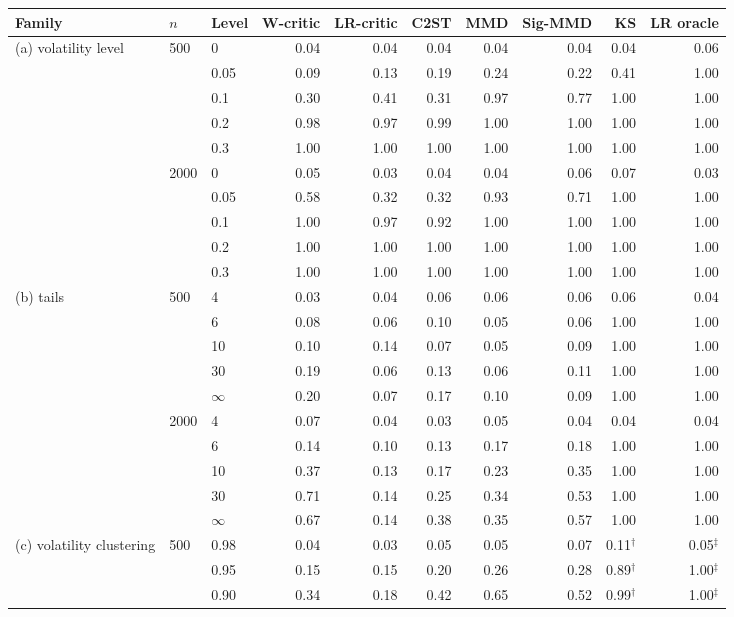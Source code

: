 \begin{tabular}{lllrrrrrrr}
\toprule
Family & $n$ & Level & W-critic & LR-critic & C2ST & MMD & Sig-MMD & KS & LR oracle \\
\midrule
(a) volatility level & 500 & 0 & 0.04 & 0.04 & 0.04 & 0.04 & 0.04 & 0.04 & 0.06 \\
 &  & 0.05 & 0.09 & 0.13 & 0.19 & 0.24 & 0.22 & 0.41 & 1.00 \\
 &  & 0.1 & 0.30 & 0.41 & 0.31 & 0.97 & 0.77 & 1.00 & 1.00 \\
 &  & 0.2 & 0.98 & 0.97 & 0.99 & 1.00 & 1.00 & 1.00 & 1.00 \\
 &  & 0.3 & 1.00 & 1.00 & 1.00 & 1.00 & 1.00 & 1.00 & 1.00 \\
 & 2000 & 0 & 0.05 & 0.03 & 0.04 & 0.04 & 0.06 & 0.07 & 0.03 \\
 &  & 0.05 & 0.58 & 0.32 & 0.32 & 0.93 & 0.71 & 1.00 & 1.00 \\
 &  & 0.1 & 1.00 & 0.97 & 0.92 & 1.00 & 1.00 & 1.00 & 1.00 \\
 &  & 0.2 & 1.00 & 1.00 & 1.00 & 1.00 & 1.00 & 1.00 & 1.00 \\
 &  & 0.3 & 1.00 & 1.00 & 1.00 & 1.00 & 1.00 & 1.00 & 1.00 \\
(b) tails & 500 & 4 & 0.03 & 0.04 & 0.06 & 0.06 & 0.06 & 0.06 & 0.04 \\
 &  & 6 & 0.08 & 0.06 & 0.10 & 0.05 & 0.06 & 1.00 & 1.00 \\
 &  & 10 & 0.10 & 0.14 & 0.07 & 0.05 & 0.09 & 1.00 & 1.00 \\
 &  & 30 & 0.19 & 0.06 & 0.13 & 0.06 & 0.11 & 1.00 & 1.00 \\
 &  & $\infty$ & 0.20 & 0.07 & 0.17 & 0.10 & 0.09 & 1.00 & 1.00 \\
 & 2000 & 4 & 0.07 & 0.04 & 0.03 & 0.05 & 0.04 & 0.04 & 0.04 \\
 &  & 6 & 0.14 & 0.10 & 0.13 & 0.17 & 0.18 & 1.00 & 1.00 \\
 &  & 10 & 0.37 & 0.13 & 0.17 & 0.23 & 0.35 & 1.00 & 1.00 \\
 &  & 30 & 0.71 & 0.14 & 0.25 & 0.34 & 0.53 & 1.00 & 1.00 \\
 &  & $\infty$ & 0.67 & 0.14 & 0.38 & 0.35 & 0.57 & 1.00 & 1.00 \\
(c) volatility clustering & 500 & 0.98 & 0.04 & 0.03 & 0.05 & 0.05 & 0.07 & 0.11$^{\dagger}$ & 0.05$^{\ddagger}$ \\
 &  & 0.95 & 0.15 & 0.15 & 0.20 & 0.26 & 0.28 & 0.89$^{\dagger}$ & 1.00$^{\ddagger}$ \\
 &  & 0.90 & 0.34 & 0.18 & 0.42 & 0.65 & 0.52 & 0.99$^{\dagger}$ & 1.00$^{\ddagger}$ \\

\end{tabular}
